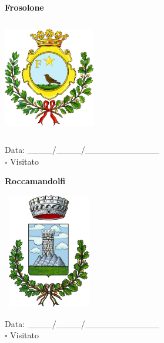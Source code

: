 \documentclass[a5paper,12pt]{article}
\begin{document}
\vspace{0.7cm}

\noindent
\begin{minipage}[t]{0.45\textwidth}
    \begin{center}
        \textbf{Frosolone}
    \end{center}
    \vspace{-0.5cm} %
    \begin{center}
        \includegraphics[height= 5cm, width=4cm]{Molise/Frosolone-Stemma.png}
    \end{center}
    \vspace{-0.4cm} %
    \begin{flushleft}
        Data: \_\_\_\_/\_\_\_\_/\_\_\_\_\_\_\_\_\_\_\_\_ \\
        $\square$ Visitato
    \end{flushleft}
\end{minipage}
\hfill
\begin{minipage}[t]{0.45\textwidth}
    \begin{center}
        \textbf{Roccamandolfi}
    \end{center}
    \vspace{-0.5cm} %
    \begin{center}
        \includegraphics[height= 5cm, width=4cm]{Molise/Roccamandolfi-Stemma.png}
    \end{center}
    \vspace{-0.4cm} %
    \begin{flushleft}
        Data: \_\_\_\_/\_\_\_\_/\_\_\_\_\_\_\_\_\_\_\_\_ \\
        $\square$ Visitato
    \end{flushleft}
\end{minipage}
\hfill
\end{document}
